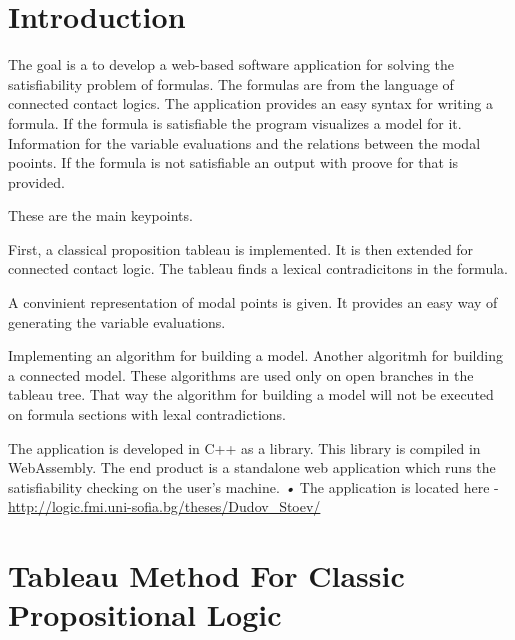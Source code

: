 \documentclass{article}
\begin{document}
	\section{Introduction}
	The goal is a to develop a web-based software application for solving the satisfiability problem of formulas. The formulas are from the language of connected contact logics. The application provides an easy syntax for writing a formula. If the formula is satisfiable the program visualizes a model for it. Information for the variable evaluations and the relations between the modal pooints. If the formula is not satisfiable an output with proove for that is provided.

	These are the main keypoints.

	First, a classical proposition tableau is implemented. It is then extended for connected contact logic. The tableau finds a lexical contradicitons in the formula.

	A convinient representation of modal points is given. It provides an easy way of generating the variable evaluations.

	Implementing an algorithm for building a model. Another algoritmh for building a connected model. These algorithms are used only on open branches in the tableau tree. That way the algorithm for building a model will not be executed on formula sections with lexal contradictions.

	The application is developed in C++ as a library. This library is compiled in WebAssembly. The end product is a standalone web application which runs the satisfiability checking on the user's machine.
	\textsl{•}
	The application is located here - \url{http://logic.fmi.uni-sofia.bg/theses/Dudov_Stoev/}

	\newpage

	\section{Tableau Method For Classic Propositional Logic}
\end{document}

